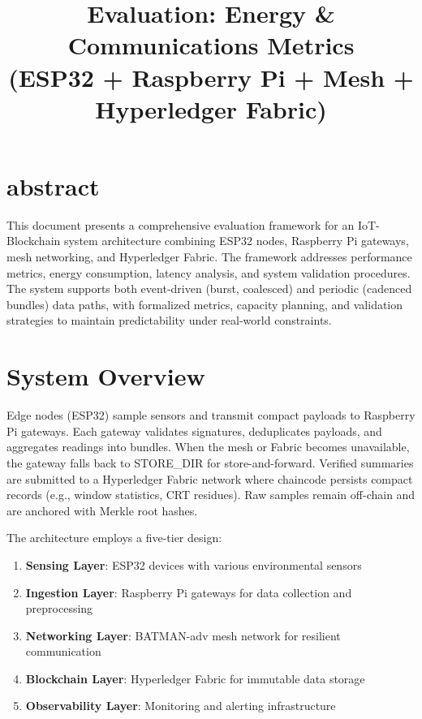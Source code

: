 \documentclass[12pt]{article}
\title{Evaluation: Energy \& Communications Metrics\\
(ESP32 + Raspberry Pi + Mesh + Hyperledger Fabric)}
\begin{document}
\maketitle

\section{abstract}
This document presents a comprehensive evaluation framework for an IoT-Blockchain system architecture combining ESP32 nodes, Raspberry Pi gateways, mesh networking, and Hyperledger Fabric. The framework addresses performance metrics, energy consumption, latency analysis, and system validation procedures. The system supports both event-driven (burst, coalesced) and periodic (cadenced bundles) data paths, with formalized metrics, capacity planning, and validation strategies to maintain predictability under real-world constraints.




\section{System Overview}
\label{sec:overview}

Edge nodes (ESP32) sample sensors and transmit compact payloads to Raspberry Pi gateways. Each gateway validates signatures, deduplicates payloads, and aggregates readings into bundles. When the mesh or Fabric becomes unavailable, the gateway falls back to \gls{STORE_DIR} for store-and-forward. Verified summaries are submitted to a Hyperledger Fabric network where chaincode persists compact records (e.g., window statistics, CRT residues). Raw samples remain off-chain and are anchored with \gls{Merkle root} hashes.

The architecture employs a five-tier design:
\begin{enumerate}
    \item \textbf{Sensing Layer}: ESP32 devices with various environmental sensors
    \item \textbf{Ingestion Layer}: Raspberry Pi gateways for data collection and preprocessing
    \item \textbf{Networking Layer}: \gls{BATMAN-adv} mesh network for resilient communication
    \item \textbf{Blockchain Layer}: Hyperledger Fabric for immutable data storage
    \item \textbf{Observability Layer}: Monitoring and alerting infrastructure
\end{enumerate}
\end{document}

